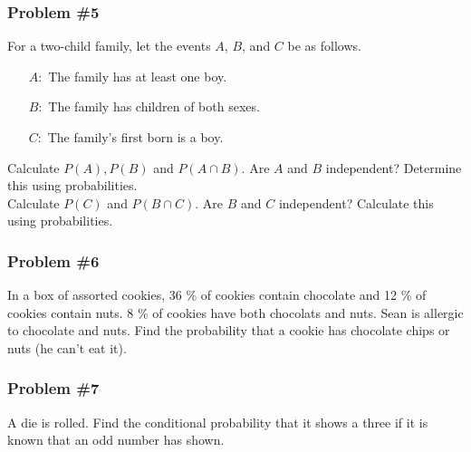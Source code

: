 \documentclass[aspectratio=169,11pt,usenames,dvipsnames]{beamer}
\begin{document}
\begin{frame}
 \frametitle{Problem \#5}
 For a two-child family, let the events $A$, $B$, and $C$ be as follows.
 \begin{itemize}
  \item [$A:$] The family has at least one boy.
  \item [$B:$] The family has children of both sexes.
  \item [$C:$] The family's first born is a boy.
 \end{itemize}
 Calculate $P(A), P(B)$ and $P(A \cap B)$. Are $A$ and $B$ independent?
 Determine this using probabilities.\\
 \pause
 Calculate $P(C)$ and $P(B \cap C)$. Are $B$ and $C$ independent? Calculate this
 using probabilities.
\end{frame}

\begin{frame}
 \frametitle{Problem \#6}
 In a box of assorted cookies, 36 \% of cookies contain chocolate and 12 \% of
 cookies contain nuts. 8 \% of cookies have both chocolats and nuts. Sean is
 allergic to chocolate and nuts. Find the probability that a cookie has
 chocolate chips or nuts (he can’t eat it).
\end{frame}

\begin{frame}
 \frametitle{Problem \#7}
 A die is rolled. Find the conditional probability that it shows a three if it
 is known that an odd number has shown.
\end{frame}
\end{document}
